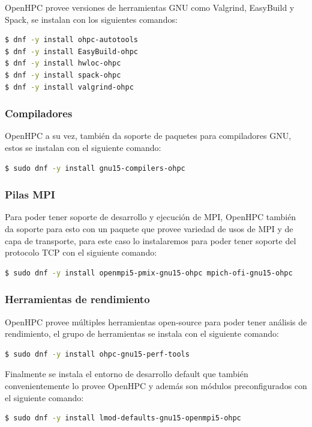 OpenHPC provee versiones de herramientas GNU como Valgrind, EasyBuild y Spack, se instalan con los siguientes comandos:
\begin{lstlisting}[language=bash, caption={Comandos para instalar herramientas GNU de OHPC}]
$ dnf -y install ohpc-autotools
$ dnf -y install EasyBuild-ohpc
$ dnf -y install hwloc-ohpc
$ dnf -y install spack-ohpc
$ dnf -y install valgrind-ohpc
\end{lstlisting}

\subsubsection{Compiladores}
OpenHPC a su vez, también da soporte de paquetes para compiladores GNU, estos se instalan con el siguiente comando:
\begin{lstlisting}[language=bash, caption={Comando para instalar compiladores GNU}]
$ sudo dnf -y install gnu15-compilers-ohpc
\end{lstlisting}

\subsubsection{Pilas MPI}
Para poder tener soporte de desarrollo y ejecución de MPI, OpenHPC también da soporte para esto con un paquete que provee variedad de usos de MPI y de capa de transporte, para este caso lo instalaremos para poder tener soporte del protocolo TCP con el siguiente comando:

\begin{lstlisting}[language=bash, caption={Comando para instalar pilas MPI}]
$ sudo dnf -y install openmpi5-pmix-gnu15-ohpc mpich-ofi-gnu15-ohpc
\end{lstlisting}

\subsubsection{Herramientas de rendimiento}
OpenHPC provee múltiples herramientas open-source para poder tener análisis de rendimiento, el grupo de herramientas se instala con el siguiente comando:
\begin{lstlisting}[language=bash, caption={Comando para instalar herramientas de análisis de rendimiento}]
$ sudo dnf -y install ohpc-gnu15-perf-tools
\end{lstlisting}

Finalmente se instala el entorno de desarrollo default que también convenientemente lo provee OpenHPC y además son módulos preconfigurados con el siguiente comando:
\begin{lstlisting}[language=bash, caption={Comando para instalar el entorno de desarrollo default}]
$ sudo dnf -y install lmod-defaults-gnu15-openmpi5-ohpc
\end{lstlisting}

